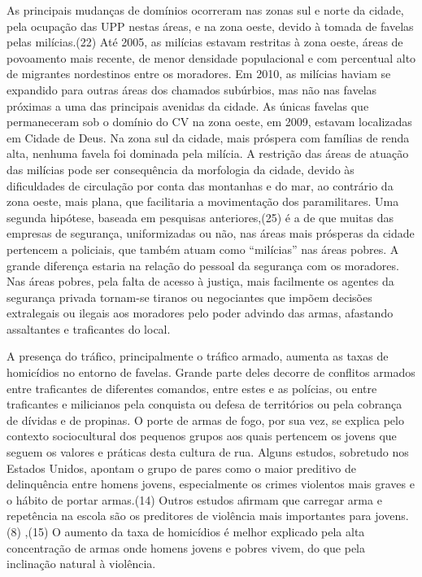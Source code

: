 \documentclass{article}
\begin{document}
As principais mudanças de domínios ocorreram nas zonas sul e norte da cidade,
pela ocupação das UPP nestas áreas, e na zona oeste, devido à tomada de favelas
pelas milícias.(22)
Até 2005, as milícias estavam restritas à zona oeste, áreas de povoamento mais
recente, de menor densidade populacional e com percentual alto de migrantes
nordestinos entre os moradores. Em 2010, as milícias haviam se expandido para
outras áreas dos chamados subúrbios, mas não nas favelas próximas a uma das
principais avenidas da cidade. As únicas favelas que permaneceram sob o domínio
do CV na zona oeste, em 2009, estavam localizadas em Cidade de Deus. Na zona sul
da cidade, mais próspera com famílias de renda alta, nenhuma favela foi dominada
pela milícia. A restrição das áreas de atuação das milícias pode ser
consequência da morfologia da cidade, devido às dificuldades de circulação por
conta das montanhas e do mar, ao contrário da zona oeste, mais plana, que
facilitaria a movimentação dos paramilitares. Uma segunda hipótese, baseada em
pesquisas anteriores,(25)
é a de que muitas das empresas de segurança, uniformizadas ou não, nas áreas
mais prósperas da cidade pertencem a policiais, que também atuam como “milícias”
nas áreas pobres. A grande diferença estaria na relação do pessoal da segurança
com os moradores. Nas áreas pobres, pela falta de acesso à justiça, mais
facilmente os agentes da segurança privada tornam-se tiranos ou negociantes que
impõem decisões extralegais ou ilegais aos moradores pelo poder advindo das
armas, afastando assaltantes e traficantes do local.

A presença do tráfico, principalmente o tráfico armado, aumenta as taxas de
homicídios no entorno de favelas. Grande parte deles decorre de conflitos
armados entre traficantes de diferentes comandos, entre estes e as polícias, ou
entre traficantes e milicianos pela conquista ou defesa de territórios ou pela
cobrança de dívidas e de propinas. O porte de armas de fogo, por sua vez, se
explica pelo contexto sociocultural dos pequenos grupos aos quais pertencem os
jovens que seguem os valores e práticas desta cultura de rua. Alguns estudos,
sobretudo nos Estados Unidos, apontam o grupo de pares como o maior preditivo de
delinquência entre homens jovens, especialmente os crimes violentos mais graves
e o hábito de portar armas.(14)
Outros estudos afirmam que carregar arma e repetência na escola são os
preditores de violência mais importantes para jovens.(8)
,(15)
O aumento da taxa de homicídios é melhor explicado pela alta concentração de
armas onde homens jovens e pobres vivem, do que pela inclinação natural à
violência.
\end{document}
